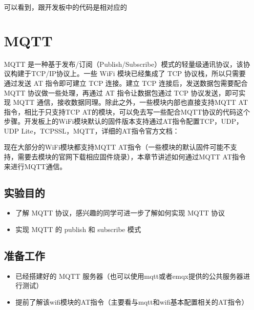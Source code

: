 \documentclass[a4paper,12pt,english]{sphinxmanual}
\begin{document}
\sphinxAtStartPar
{}

\sphinxAtStartPar
可以看到，跟开发板中的代码是相对应的

\sphinxAtStartPar
{}

\sphinxstepscope


\section{MQTT}
\label{\detokenize{exp-stm32/mqtt:mqtt}}\label{\detokenize{exp-stm32/mqtt::doc}}
\sphinxAtStartPar
MQTT 是一种基于发布/订阅（Publish/Subscribe）模式的轻量级通讯协议，该协议构建于TCP/IP协议上。一些 WiFi 模块已经集成了 TCP 协议栈，所以只需要通过发送 AT 指令即可建立 TCP 连接。建立 TCP 连接后，发送数据包需要配合 MQTT 协议做一些处理，再通过 AT 指令让数据包通过 TCP 协议发送，即可实现 MQTT 通信，接收数据同理。除此之外，一些模块内部也直接支持MQTT AT指令，相比于只支持TCP AT的模块，可以免去写一些配合MQTT协议的代码这个步骤。开发板上的WiFi模块默认的固件版本支持通过AT指令配置TCP，UDP，UDP Lite，TCP\sphinxhyphen{}SSL，MQTT，详细的AT指令官方文档：

\sphinxAtStartPar
现在大部分的WiFi模块都支持MQTT AT指令（一些模块的默认固件可能不支持，需要去模块的官网下载相应固件烧录），本章节讲述如何通过MQTT AT指令来进行MQTT通信。


\subsection{实验目的}
\label{\detokenize{exp-stm32/mqtt:id1}}\begin{itemize}
\item {} 
\sphinxAtStartPar
了解 MQTT 协议，感兴趣的同学可进一步了解如何实现 MQTT 协议

\item {} 
\sphinxAtStartPar
实现 MQTT 的 publish 和 subscribe 模式

\end{itemize}


\subsection{准备工作}
\label{\detokenize{exp-stm32/mqtt:id2}}\begin{itemize}
\item {} 
\sphinxAtStartPar
已经搭建好的 MQTT 服务器（也可以使用mqtt或者emqx提供的公共服务器进行测试）

\item {} 
\sphinxAtStartPar
提前了解该wifi模块的AT指令（主要看与mqtt和wifi基本配置相关的AT指令）

\end{itemize}
\end{document}
